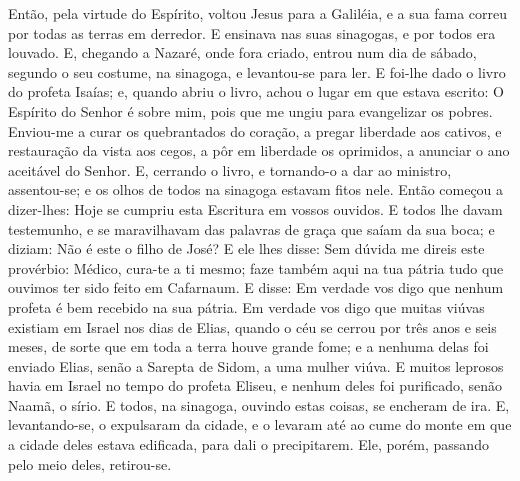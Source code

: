 Então, pela virtude do Espírito, voltou Jesus para a Galiléia, e
a sua fama correu por todas as terras em derredor. E ensinava
nas suas sinagogas, e por todos era louvado. E, chegando a
Nazaré, onde fora criado, entrou num dia de sábado, segundo o seu
costume, na sinagoga, e levantou-se para ler. E foi-lhe dado
o livro do profeta Isaías; e, quando abriu o livro, achou o lugar em
que estava escrito: O Espírito do Senhor é sobre mim, pois
que me ungiu para evangelizar os pobres. Enviou-me a curar os
quebrantados do coração, a pregar liberdade aos cativos, e
restauração da vista aos cegos, a pôr em liberdade os oprimidos, a
anunciar o ano aceitável do Senhor. E, cerrando o livro, e
tornando-o a dar ao ministro, assentou-se; e os olhos de todos na
sinagoga estavam fitos nele. Então começou a dizer-lhes: Hoje
se cumpriu esta Escritura em vossos ouvidos. E todos lhe
davam testemunho, e se maravilhavam das palavras de graça que saíam
da sua boca; e diziam: Não é este o filho de José? E ele lhes
disse: Sem dúvida me direis este provérbio: Médico, cura-te a ti
mesmo; faze também aqui na tua pátria tudo que ouvimos ter sido
feito em Cafarnaum. E disse: Em verdade vos digo que nenhum
profeta é bem recebido na sua pátria. Em verdade vos digo que
muitas viúvas existiam em Israel nos dias de Elias, quando o céu se
cerrou por três anos e seis meses, de sorte que em toda a terra
houve grande fome; e a nenhuma delas foi enviado Elias, senão
a Sarepta de Sidom, a uma mulher viúva. E muitos leprosos
havia em Israel no tempo do profeta Eliseu, e nenhum deles foi
purificado, senão Naamã, o sírio. E todos, na sinagoga,
ouvindo estas coisas, se encheram de ira. E, levantando-se, o
expulsaram da cidade, e o levaram até ao cume do monte em que a
cidade deles estava edificada, para dali o precipitarem. Ele,
porém, passando pelo meio deles, retirou-se.

